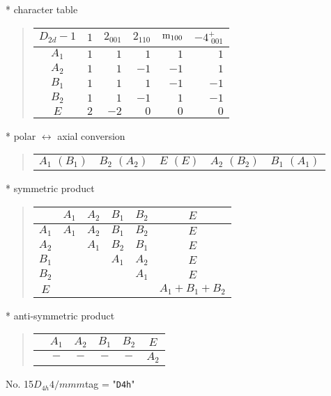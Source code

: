 \documentclass[fleqn,10pt,landscape]{jsarticle}
\begin{document}
* character table
\begin{quote}
\begin{tabular}{crrrrr} \hline \hline
$ D_{2d}-1 $ & $ 1 $ & $ 2{}_{001} $ & $ 2{}_{110} $ & $ {\rm m}_{100} $ & $ -4^{+}_{\,\,001} $ \\ \hline
$ A_{1} $ & $ 1 $ & $ 1 $ & $ 1 $ & $ 1 $ & $ 1 $ \\
$ A_{2} $ & $ 1 $ & $ 1 $ & $ -1 $ & $ -1 $ & $ 1 $ \\
$ B_{1} $ & $ 1 $ & $ 1 $ & $ 1 $ & $ -1 $ & $ -1 $ \\
$ B_{2} $ & $ 1 $ & $ 1 $ & $ -1 $ & $ 1 $ & $ -1 $ \\
$ E $ & $ 2 $ & $ -2 $ & $ 0 $ & $ 0 $ & $ 0 $ \\
 \hline \hline
\end{tabular}
\end{quote}
* polar $\leftrightarrow$ axial conversion
\begin{quote}
\begin{tabular}{ccccc}
$ A_{1}\,\,(B_{1}) $ & $ B_{2}\,\,(A_{2}) $ & $ E\,\,(E) $ & $ A_{2}\,\,(B_{2}) $ & $ B_{1}\,\,(A_{1}) $
\end{tabular}
\end{quote}
* symmetric product
\begin{quote}
\begin{tabular}{c|ccccc} \hline \hline
 & $ A_{1} $ & $ A_{2} $ & $ B_{1} $ & $ B_{2} $ & $ E $ \\ \hline
$ A_{1} $ & $ A_{1} $ & $ A_{2} $ & $ B_{1} $ & $ B_{2} $ & $ E $ \\
$ A_{2} $ & $  $ & $ A_{1} $ & $ B_{2} $ & $ B_{1} $ & $ E $ \\
$ B_{1} $ & $  $ & $  $ & $ A_{1} $ & $ A_{2} $ & $ E $ \\
$ B_{2} $ & $  $ & $  $ & $  $ & $ A_{1} $ & $ E $ \\
$ E $ & $  $ & $  $ & $  $ & $  $ & $ A_{1} + B_{1} + B_{2} $ \\
 \hline \hline
\end{tabular}
\end{quote}
* anti-symmetric product
\begin{quote}
\begin{tabular}{cccccc} \hline \hline
 & $ A_{1} $ & $ A_{2} $ & $ B_{1} $ & $ B_{2} $ & $ E $ \\ \hline
$  $ & $ - $ & $ - $ & $ - $ & $ - $ & $ A_{2} $ \\
 \hline \hline
\end{tabular}
\end{quote}
\newpage
No. 15\quad$D_{4h}$\quad$4/mmm$\quad[ tetragonal ]
tag = "{\tt D4h}"
\end{document}
